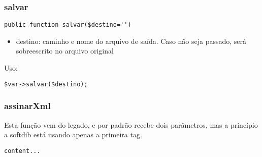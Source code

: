 \documentclass[a4paper]{article}
\begin{document}
\subsubsection{salvar}
\begin{lstlisting}
public function salvar($destino='')
\end{lstlisting}
\begin{itemize}
	\item destino: caminho e nome do arquivo de saída. Caso não seja passado, será sobreescrito no arquivo original
\end{itemize}
Uso:
\begin{lstlisting}
$var->salvar($destino);
\end{lstlisting}
\subsubsection{assinarXml}
Esta função vem do legado, e por padrão recebe dois parâmetros, mas a princípio a softdib está usando apenas a primeira tag.
\begin{lstlisting}
content...
\end{lstlisting}
\end{document}
